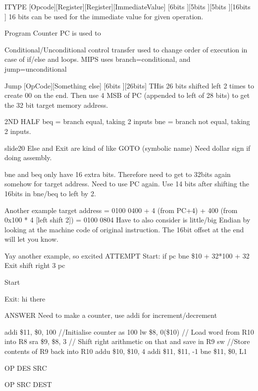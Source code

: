 \documentclass{article}
\newcommand\tab[1][0.5cm]{\hspace*{#1}}
\begin{document}
		ITYPE
		[Opcode][Register][Register][ImmediateValue]
		[6bits ][5bits   ][5bits   ][16bits        ]
		16 bits can be used for the immediate value for given operation.

	Program Counter PC is used to 

	Conditional/Unconditional control transfer used to change order of execution in case of if/else and loops.
	MIPS uses branch=conditional, and jump=unconditional

	Jump [OpCode][Something else]
		 [6bits ][26bits] 
		 THis 26 bits shifted left 2 times to create 00 on the end. Then use 4 MSB of PC (appended to left of 28 bits) to get the 32 bit target memory address.


2ND HALF
	beq = branch equal, taking 2 inputs
	bne = branch not equal, taking 2 inputs.

slide20
	Else and Exit are kind of like GOTO (symbolic name) Need dollar sign if doing assembly.

	bne and beq only have 16 extra bits.  Therefore need to get to 32bits again somehow for target address. Need to use PC again. Use 14 bits after shifting the 16bits in bne/beq to left by 2.

	Another example
	target address =
		0100 0400 + 4 (from PC+4) + 400 (from 0x100 * 4 [left shift 2])
		= 0100 0804
	Have to also consider is little/big Endian by looking at the machine code of original instruction. The 16bit offset at the end will let you know.

	Yay another example, so excited
		ATTEMPT
			Start: if pc bne \$10 + 32*100 + 32 Exit
				shift right 3 pc

			Start

			Exit: hi there

		ANSWER
			Need to make a counter, use addi for increment/decrement

			addi \$11, \$0, 100	\tab //Initialise counter as 100
			lw \$8, 0(\$10)	\tab // Load word from R10 into R8
			sra	\$9, \$8, 3	\tab // Shift right arithmetic on that and save in R9
			sw 	\tab //Store contents of R9 back into R10
			addu \$10, \$10, 4
			addi \$11, \$11, -1
			bne \$11, \$0, L1

			OP DES SRC

			OP SRC DEST
\end{document}
